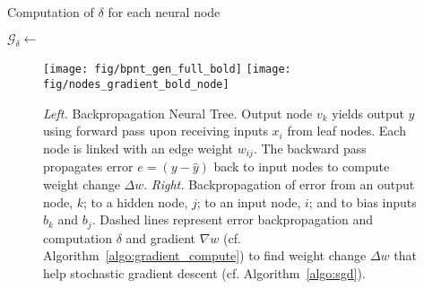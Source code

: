 \documentclass[11pt,a4paper]{article}
\begin{document}
    \begin{algorithm}[h!]
        \caption{Computation of $ \delta $ for each neural node}
        \label{algo:delta_compute}
        \begin{algorithmic}[1]            		
              
  
\Else  {} 
              
              
             
  
\EndIf
            \State $ \mathcal{G}_{\delta} \leftarrow $  
            \EndFor
            \EndProcedure       
        \end{algorithmic}
    \end{algorithm}
    
    
    \begin{figure}
        \centering
        \texttt{[image: fig/bpnt\_gen\_full\_bold]}	\texttt{[image: fig/nodes\_gradient\_bold\_node]}
\caption{\textit{Left.} Backpropagation Neural Tree.  Output node $ v_k $ yields output $ y $ using forward pass upon receiving inputs $ x_i $ from leaf nodes. Each node is linked with an edge weight $ w_{ij} $. The backward pass propagates error $ e = (y - \hat{y}) $ back to input nodes to compute weight change $ \Delta w$. \textit{Right.} Backpropagation of error from an output node, $ k $; to a hidden node, $ j $; to an input node, $ i $; and to bias inputs $ b_k $ and $ b_j $. Dashed lines represent error backpropagation  and computation $ \delta $ and gradient $ \nabla w $ (cf. Algorithm~\ref{algo:gradient_compute}) to find weight change $ \Delta w $ that help stochastic gradient descent (cf. Algorithm~\ref{algo:sgd}).
        \label{fig:BNeuralT}}
\end{figure}
    
\end{document}
